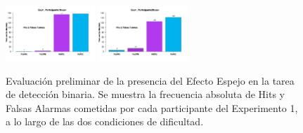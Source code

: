 \begin{figure}[th]
\includegraphics[width=0.30\textwidth]{Figures/MirrorRate_Exp1_P19} \includegraphics[width=0.30\textwidth]{Figures/MirrorRate_Exp1_P20} 
\caption[Hits y Falsas Alarmas entre condiciones; Experimento 1]{Evaluación preliminar de la presencia del Efecto Espejo en la tarea de detección binaria. Se muestra la frecuencia absoluta de Hits y Falsas Alarmas cometidas por cada participante del Experimento 1, a lo largo de las dos condiciones de dificultad.}
\label{fig:MRate_E1}
\end{figure}

